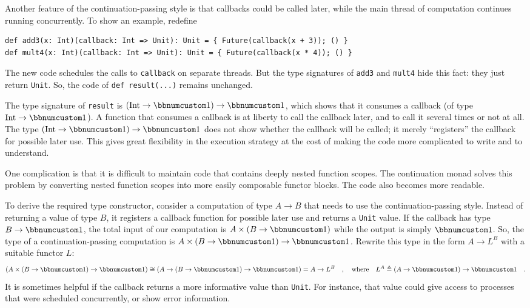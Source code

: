 Another feature of the continuation-passing style is that callbacks
could be called later, while the main thread of computation continues
running concurrently. To show an example, redefine
\begin{lstlisting}
def add3(x: Int)(callback: Int => Unit): Unit = { Future(callback(x + 3)); () }
def mult4(x: Int)(callback: Int => Unit): Unit = { Future(callback(x * 4)); () }
\end{lstlisting}
The new code schedules the calls to \lstinline!callback! on separate
threads. But the type signatures of \lstinline!add3! and \lstinline!mult4!
hide this fact: they just return \lstinline!Unit!. So, the code of
\lstinline!def result(...)! remains unchanged.

The type signature of \lstinline!result! is $\left(\text{Int}\rightarrow\bbnum 1\right)\rightarrow\bbnum 1$,
which shows that it consumes a callback (of type $\text{Int}\rightarrow\bbnum 1$).
A function that consumes a callback is at liberty to call the callback
later, and to call it several times or not at all. The type $\left(\text{Int}\rightarrow\bbnum 1\right)\rightarrow\bbnum 1$
does not show whether the callback will be called; it merely \textsf{``}registers\textsf{''}
the callback for possible later use. This gives great flexibility
in the execution strategy \textemdash{} at the cost of making the
code more complicated to write and to understand.

One complication is that it is difficult to maintain code that contains
deeply nested function scopes. The continuation monad solves this
problem by converting nested function scopes into more easily composable
functor blocks. The code also becomes more readable.

To derive the required type constructor, consider a computation of
type $A\rightarrow B$ that needs to use the continuation-passing
style. Instead of returning a value of type $B$, it registers a callback
function for possible later use and returns a \lstinline!Unit! value.
If the callback has type $B\rightarrow\bbnum 1$, the total input
of our computation is $A\times\left(B\rightarrow\bbnum 1\right)$
while the output is simply $\bbnum 1$. So, the type of a continuation-passing
computation is $A\times\left(B\rightarrow\bbnum 1\right)\rightarrow\bbnum 1$.
Rewrite this type in the form $A\rightarrow L^{B}$ with a suitable
functor $L$:
\[
\left(A\times\left(B\rightarrow\bbnum 1\right)\rightarrow\bbnum 1\right)\cong\left(A\rightarrow\left(B\rightarrow\bbnum 1\right)\rightarrow\bbnum 1\right)=A\rightarrow L^{B}\quad,\quad\text{where}\quad L^{A}\triangleq\left(A\rightarrow\bbnum 1\right)\rightarrow\bbnum 1\quad.
\]
It is sometimes helpful if the callback returns a more informative
value than \lstinline!Unit!. For instance, that value could give
access to processes that were scheduled concurrently, or show error
information.

